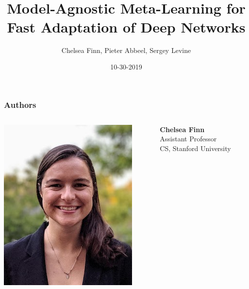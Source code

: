 \documentclass[compress]{beamer}
\title{Model-Agnostic Meta-Learning for Fast Adaptation of Deep Networks}
\author[Presentor: Shih-Ming Wang]{Chelsea Finn, Pieter Abbeel,  Sergey Levine}
\institute[]{Presented by Shih-Ming Wang}
\date{10-30-2019}
\begin{document}
\begin{frame}
    \maketitle
\end{frame}

\begin{frame}
    \frametitle{Authors}

    \begin{columns}
        \begin{column}{.3\textwidth}
            \includegraphics[width=\textwidth,height=.5\textheight]{auth1}
        \end{column}
        \begin{column}{.2\textwidth}
            \tiny
            \textbf{Chelsea Finn} \\
            Assistant Professor \\
            CS, Stanford University \\
        \end{column}

\end{columns}
\end{frame}
\end{document}
